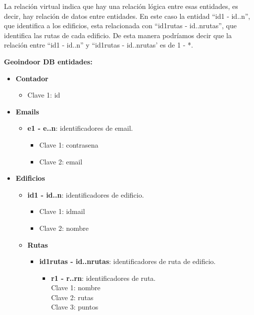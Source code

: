 La relación virtual indica que hay una relación lógica entre esas entidades, es decir, hay relación de datos entre entidades. En este caso la entidad ``id1 - id..n'', que identifica a los edificios, esta relacionada con ``id1rutas - id..nrutas'', que identifica las rutas de cada edificio. De esta manera podríamos decir que la relación entre ``id1 - id..n'' y ``id1rutas - id..nrutas' es de 1 - *.

\newpage
\textbf{ Geoindoor DB entidades:}
\begin{itemize}
	\item \textbf{Contador}
	\begin{itemize}
		\item Clave 1: id
	\end{itemize}
	\item \textbf{Emails}
	\begin{itemize}
		\item \textbf{e1 - e..n}: identificadores de email.
		\begin{itemize}
			\item Clave 1: contrasena
			\item Clave 2: email 
		\end{itemize}
	\end{itemize}
	\item \textbf{Edificios}
	\begin{itemize}
		\item \textbf{id1 - id..n}: identificadores de edificio.
		\begin{itemize}
			\item Clave 1: idmail 
			\item Clave 2: nombre
		\end{itemize}
		\item \textbf{Rutas}
		\begin{itemize}
			\item \textbf{id1rutas - id..nrutas}: identificadores de ruta de edificio.
			\begin{itemize}
				\item \textbf{r1 - r..rn}: identificadores de ruta. \\
				\hspace{0.5cm} Clave 1: nombre \\
				\hspace{0.5cm} Clave 2: rutas\\
				\hspace{0.5cm} Clave 3: puntos \\
			\end{itemize}
		\end{itemize}
	\end{itemize}
\end{itemize}




